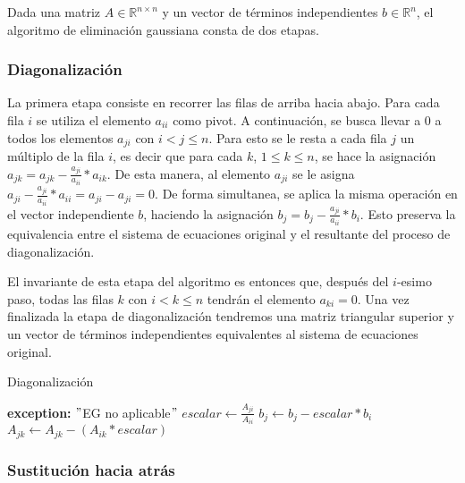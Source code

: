 Dada una matriz $A \in \mathbb{R}^{n \times n}$ y un vector de términos independientes $b \in \mathbb{R}^{n}$, el algoritmo de eliminación gaussiana consta de dos etapas.

\subsubsection*{Diagonalización}

La primera etapa consiste en recorrer las filas de arriba hacia abajo. Para cada fila $i$ se utiliza el elemento $a_{ii}$ como pivot. A continuación, se busca llevar a 0 a todos los elementos $a_{ji}$ con $i < j \leq n$. Para esto se le resta a cada fila $j$ un múltiplo de la fila $i$, es decir que para cada $k$, $1 \leq k \leq n$, se hace la asignación $a_{jk} = a_{jk} - \frac{a_{ji}}{a_{ii}} * a_{ik}$. De esta manera, al elemento $a_{ji}$ se le asigna $a_{ji} - \frac{a_{ji}}{a_{ii}} * a_{ii} = a_{ji} - a_{ji} = 0$. De forma simultanea, se aplica la misma operación en el vector independiente $b$, haciendo la asignación $b_{j} = b_{j} - \frac{a_{ji}}{a_{ii}} * b_{i}$. Esto preserva la equivalencia entre el sistema de ecuaciones original y el resultante del proceso de diagonalización.

El invariante de esta etapa del algoritmo es entonces que, después del $i$-esimo paso, todas las filas $k$ con $i < k \leq n$ tendrán el elemento $a_{ki} = 0$. Una vez finalizada la etapa de diagonalización tendremos una matriz triangular superior y un vector de términos independientes equivalentes al sistema de ecuaciones original.


\begin{algorithm}
    \caption{Diagonalización}\label{alg:diagonalize}
    \begin{algorithmic}
        \State \textbf{exception:} $"$EG no aplicable$"$
        \EndIf
        \State $escalar \gets \frac{A_{ji}}{A_{ii}}$
        \State $b_{j} \gets b_{j} - escalar * b_{i}$
        \State $A_{jk} \gets A_{jk} - (A_{ik} * escalar)$
        \EndFor
        \EndIf
        \EndFor
    \end{algorithmic}
\end{algorithm}


\subsubsection*{Sustitución hacia atrás}

